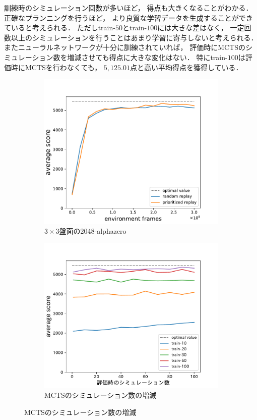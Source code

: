 訓練時のシミュレーション回数が多いほど， 得点も大きくなることがわかる．
正確なプランニングを行うほど， より良質な学習データを生成することができていると考えられる．
ただしtrain-$50$とtrain-$100$には大きな差はなく， 一定回数以上のシミュレーションを行うことはあまり学習に寄与しないと考えられる．
またニューラルネットワークが十分に訓練されていれば， 評価時にMCTSのシミュレーション数を増減させても得点に大きな変化はない．
特にtrain-$100$は評価時にMCTSを行わなくても， $5,125.01$点と高い平均得点を獲得している．
\begin{figure}
    \begin{subfigure}[T]{0.5\columnwidth}
        \centering
        \includegraphics[width=\columnwidth]{figures/alphazero_3x3.pdf}
        \caption{$3\times3$盤面の2048-alphazero}
        \label{fig:mini2048_alphazero}
    \end{subfigure}
    \begin{subfigure}[T]{0.5\columnwidth}
        \centering
        \includegraphics[width=\columnwidth]{figures/3x3_2048_alphazero_simulations.pdf}
        \caption{MCTSのシミュレーション数の増減}
        \label{fig:mini2048_alphazero_simulations}
    \end{subfigure}
\end{figure}

